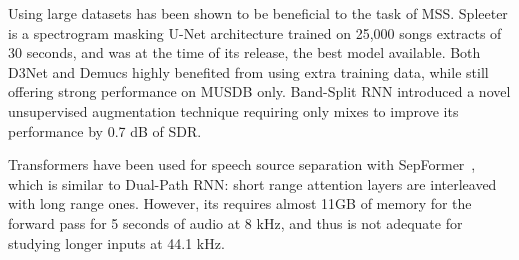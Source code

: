 \documentclass{article}
\begin{document}
Using large datasets has been shown to be beneficial to the task of MSS.
Spleeter \cite{spleeter} is a spectrogram masking U-Net architecture trained on 25,000 songs extracts of 30 seconds,
and was at the time of its release, the best model available. Both D3Net and Demucs highly benefited from
using extra training data, while still offering strong performance on MUSDB only.
Band-Split RNN introduced a novel unsupervised augmentation technique requiring only mixes to improve its 
performance by 0.7 dB of SDR.

Transformers have been used for speech source separation with SepFormer~\cite{subakan2021attention},  which is similar to Dual-Path RNN: short range attention layers are interleaved with long range ones.
However, its requires almost 11GB of memory for the forward pass for 5 seconds of audio at 8 kHz, and thus is not 
adequate for studying longer inputs at 44.1 kHz.
\end{document}
